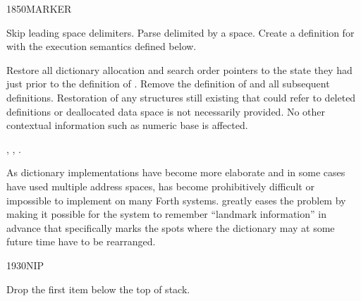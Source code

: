 \begin{worddef}{1850}{MARKER}
\item {}

	Skip leading space delimiters. Parse  delimited by
	a space. Create a definition for  with the execution
	semantics defined below.

\execute[name]
	\stack{}{}

	Restore all dictionary allocation and search order pointers to
	the state they had just prior to the definition of .
	Remove the definition of  and all subsequent
	definitions. Restoration of any structures still existing that
	could refer to deleted definitions or deallocated data space is
	not necessarily provided. No other contextual information such
	as numeric base is affected.

\see {},
	,
	.

	\begin{rationale} %
		As dictionary implementations have become more elaborate
		and in some cases have used multiple address spaces,
		 has become prohibitively difficult or
		impossible to implement on many Forth systems. 
		greatly eases the problem by making it possible for the
		system to remember ``landmark information'' in advance that
		specifically marks the spots where the dictionary may at some
		future time have to be rearranged.
	\end{rationale}
\end{worddef}


\begin{worddef}{1930}{NIP}
\item {}

	Drop the first item below the top of stack.
\end{worddef}


